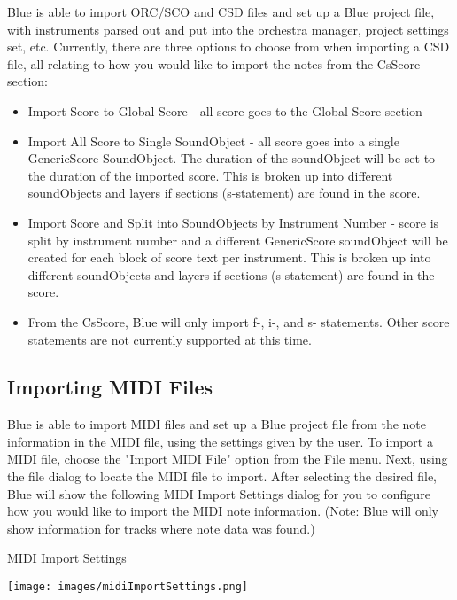 Blue is able to import ORC/SCO and CSD files and set up a Blue project
file, with instruments parsed out and put into the orchestra manager,
project settings set, etc. Currently, there are three options to choose
from when importing a CSD file, all relating to how you would like to
import the notes from the CsScore section:

\begin{itemize}
\item
  Import Score to Global Score - all score goes to the Global Score
  section
\item
  Import All Score to Single SoundObject - all score goes into a single
  GenericScore SoundObject. The duration of the soundObject will be set
  to the duration of the imported score. This is broken up into
  different soundObjects and layers if sections (s-statement) are found
  in the score.
\item
  Import Score and Split into SoundObjects by Instrument Number - score
  is split by instrument number and a different GenericScore soundObject
  will be created for each block of score text per instrument. This is
  broken up into different soundObjects and layers if sections
  (s-statement) are found in the score.
\end{itemize}

\begin{itemize}
\item
  From the CsScore, Blue will only import f-, i-, and s- statements.
  Other score statements are not currently supported at this time.
\end{itemize}

\subsection{Importing MIDI Files}\label{importMIDI}

Blue is able to import MIDI files and set up a Blue project file from
the note information in the MIDI file, using the settings given by the
user. To import a MIDI file, choose the "Import MIDI File" option from
the File menu. Next, using the file dialog to locate the MIDI file to
import. After selecting the desired file, Blue will show the following
MIDI Import Settings dialog for you to configure how you would like to
import the MIDI note information. (Note: Blue will only show information
for tracks where note data was found.)

MIDI Import Settings

\texttt{[image: images/midiImportSettings.png]}

